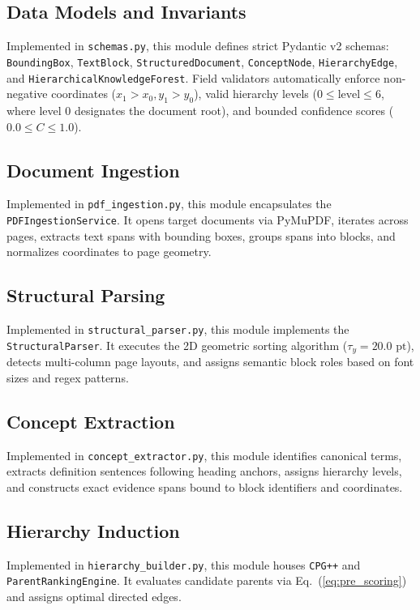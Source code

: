 \documentclass[12pt,a4paper]{report}
\begin{document}
\subsection{Data Models and Invariants}
Implemented in \texttt{schemas.py}, this module defines strict Pydantic v2 schemas: \texttt{BoundingBox}, \texttt{TextBlock}, \texttt{StructuredDocument}, \texttt{ConceptNode}, \texttt{HierarchyEdge}, and \texttt{HierarchicalKnowledgeForest}. Field validators automatically enforce non-negative coordinates ($x_1 > x_0, y_1 > y_0$), valid hierarchy levels ($0 \le \text{level} \le 6$, where level 0 designates the document root), and bounded confidence scores ($0.0 \le C \le 1.0$).

\subsection{Document Ingestion}
Implemented in \texttt{pdf\_ingestion.py}, this module encapsulates the \texttt{PDFIngestionService}. It opens target documents via PyMuPDF, iterates across pages, extracts text spans with bounding boxes, groups spans into blocks, and normalizes coordinates to page geometry.

\subsection{Structural Parsing}
Implemented in \texttt{structural\_parser.py}, this module implements the \texttt{StructuralParser}. It executes the 2D geometric sorting algorithm ($\tau_y = 20.0\text{ pt}$), detects multi-column page layouts, and assigns semantic block roles based on font sizes and regex patterns.

\subsection{Concept Extraction}
Implemented in \texttt{concept\_extractor.py}, this module identifies canonical terms, extracts definition sentences following heading anchors, assigns hierarchy levels, and constructs exact evidence spans bound to block identifiers and coordinates.

\subsection{Hierarchy Induction}
Implemented in \texttt{hierarchy\_builder.py}, this module houses \texttt{CPG++} and \texttt{ParentRankingEngine}. It evaluates candidate parents via Eq.~(\ref{eq:pre_scoring}) and assigns optimal directed edges.
\end{document}
